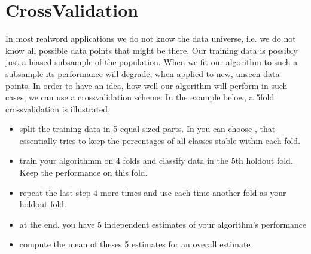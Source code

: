 \documentclass[letterpaper,10pt,english]{jupyterBook}
\begin{document}
\chapter{Cross\sphinxhyphen{}Validation}
\label{\detokenize{dependent_data:cross-validation}}
\sphinxAtStartPar
In most real\sphinxhyphen{}word applications we do not know the data universe, i.e. we do not know all possible data points that might be there. Our training data is possibly just a biased subsample of the population.
When we fit our algorithm to such a subsample its performance will degrade, when applied to new, unseen data points. In order to have an idea, how well our algorithm will perform in such cases, we can use a cross\sphinxhyphen{}validation scheme:
In the example below, a 5\sphinxhyphen{}fold cross\sphinxhyphen{}validation is illustrated.
\begin{itemize}
\item {} 
\sphinxAtStartPar
split the training data in 5 equal sized parts. In  you can choose , that essentially tries to keep the percentages of all classes stable within each fold.

\item {} 
\sphinxAtStartPar
train your algorithmm on 4 folds and classify data in the 5th hold\sphinxhyphen{}out fold. Keep the performance on this fold.

\item {} 
\sphinxAtStartPar
repeat the last step 4 more times and use each time another fold as your hold\sphinxhyphen{}out fold.

\item {} 
\sphinxAtStartPar
at the end, you have 5 independent estimates of your algorithm’s performance

\item {} 
\sphinxAtStartPar
compute the mean of theses 5 estimates for an overall estimate

\end{itemize}
\end{document}
